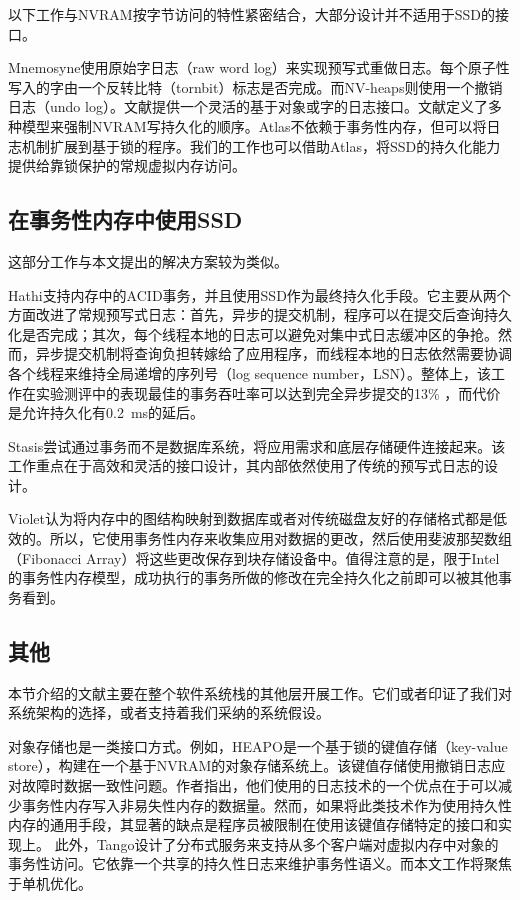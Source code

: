 以下工作与NVRAM按字节访问的特性紧密结合，大部分设计并不适用于SSD的接口。

Mnemosyne\cite{Volos:2011:MLP:1950365.1950379}使用原始字日志（raw word log）来实现预写式重做日志。每个原子性写入的字由一个反转比特（tornbit）标志是否完成。而NV-heaps\cite{Coburn:2011:NMP:1950365.1950380}则使用一个撤销日志（undo log）。文献\cite{Kannan:2014:RCP}提供一个灵活的基于对象或字的日志接口。文献\cite{Pelley:2014:MP}定义了多种模型来强制NVRAM写持久化的顺序。Atlas\cite{Chakrabarti:2014:ALL:2660193.2660224}不依赖于事务性内存，但可以将日志机制扩展到基于锁的程序。我们的工作也可以借助Atlas，将SSD的持久化能力提供给靠锁保护的常规虚拟内存访问。

\subsection{在事务性内存中使用SSD}

这部分工作与本文提出的解决方案较为类似。

Hathi\cite{Saxena:2012:HDT:2236584.2236589}支持内存中的ACID事务，并且使用SSD作为最终持久化手段。它主要从两个方面改进了常规预写式日志：首先，异步的提交机制，程序可以在提交后查询持久化是否完成；其次，每个线程本地的日志可以避免对集中式日志缓冲区的争抢。然而，异步提交机制将查询负担转嫁给了应用程序，而线程本地的日志依然需要协调各个线程来维持全局递增的序列号（log sequence number，LSN）。整体上，该工作在实验测评中的表现最佳的事务吞吐率可以达到完全异步提交的13\% ，而代价是允许持久化有0.2~ms的延后。

Stasis\cite{Sears:2006:SFT:1298455.1298459}尝试通过事务而不是数据库系统，将应用需求和底层存储硬件连接起来。该工作重点在于高效和灵活的接口设计，其内部依然使用了传统的预写式日志的设计。

Violet\cite{Santry:2014:VSS:2643634.2643637}认为将内存中的图结构映射到数据库或者对传统磁盘友好的存储格式都是低效的。所以，它使用事务性内存来收集应用对数据的更改，然后使用斐波那契数组（Fibonacci Array）将这些更改保存到块存储设备中。值得注意的是，限于Intel的事务性内存模型，成功执行的事务所做的修改在完全持久化之前即可以被其他事务看到。

\subsection{其他}

本节介绍的文献主要在整个软件系统栈的其他层开展工作。它们或者印证了我们对系统架构的选择，或者支持着我们采纳的系统假设。

对象存储也是一类接口方式。例如，HEAPO\cite{Hwang:2014:HHP:2705611.2629619}是一个基于锁的键值存储（key-value store），构建在一个基于NVRAM的对象存储系统上。该键值存储使用撤销日志应对故障时数据一致性问题。作者指出，他们使用的日志技术的一个优点在于可以减少事务性内存写入非易失性内存的数据量。然而，如果将此类技术作为使用持久性内存的通用手段，其显著的缺点是程序员被限制在使用该键值存储特定的接口和实现上。
此外，Tango\cite{Balakrishnan:2013:TDD:2517349.2522732}设计了分布式服务来支持从多个客户端对虚拟内存中对象的事务性访问。它依靠一个共享的持久性日志来维护事务性语义。而本文工作将聚焦于单机优化。


